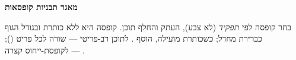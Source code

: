 %
%
%
%
%



{\LARGE\bfseries\noindent מאגר תבניות קופסאות\par}\medskip
\noindent בחר קופסה לפי \emph{תפקיד} (לא צבע), העתק והחלף תוכן. קופסה היא
ללא כותרת ובגודל הגוף כברירת מחדל; כשכותרת מועילה, הוסף
\code{[frametitle=\{...\}]}. לתוכן רב-פריטי — שורה לכל פריט (\code{\textbackslash\textbackslash});
לקופסת-ייחוס קצרה — .
\bigskip

